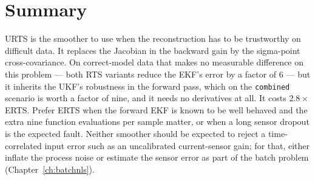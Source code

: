 \section{Summary}
URTS is the smoother to use when the reconstruction has to be trustworthy on difficult data.  It
replaces the Jacobian in the backward gain by the sigma-point cross-covariance.  On
correct-model data that makes no measurable difference on this problem --- both RTS variants reduce
the EKF's error by a factor of $6$ --- but it inherits the UKF's robustness in the forward pass,
which on the \texttt{combined} scenario is worth a factor of nine, and it needs no derivatives at
all.  It costs $2.8\times$ ERTS.  Prefer ERTS when the forward EKF is known to be well behaved and
the extra nine function evaluations per sample matter, or when a long sensor dropout is the expected
fault.  Neither smoother should be expected to reject a
time-correlated input error such as an uncalibrated current-sensor gain; for that, either inflate
the process noise or estimate the sensor error as part of the batch problem
(Chapter~\ref{ch:batchnls}).
